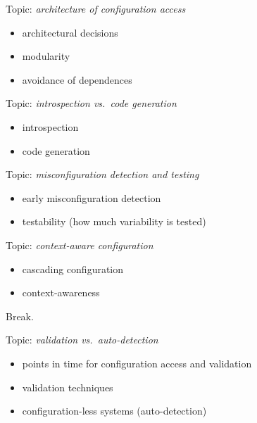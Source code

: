 \begin{frame}
	Topic: \textit{architecture of configuration access}
	\begin{itemize}
		\item architectural decisions
		\item modularity
		\item avoidance of dependences
	\end{itemize}
\end{frame}

\begin{frame}
	Topic: \textit{introspection vs.\ code generation}
	\begin{itemize}
		\item introspection
		\item code generation
	\end{itemize}
\end{frame}

\begin{frame}
	Topic: \textit{misconfiguration detection and testing}
	\begin{itemize}
		\item early misconfiguration detection
		\item testability (how much variability is tested)
	\end{itemize}
\end{frame}

\begin{frame}
	Topic: \textit{context-aware configuration}
	\begin{itemize}
		\item cascading configuration
		\item context-awareness
	\end{itemize}
\end{frame}

\begin{assignment}
	\begin{task}
	Break.
	\end{task}
\end{assignment}

\begin{frame}
	Topic: \textit{validation vs.\ auto-detection}
	\begin{itemize}
		\item points in time for configuration access and validation
		\item validation techniques
		\item configuration-less systems (auto-detection)
	\end{itemize}
\end{frame}

